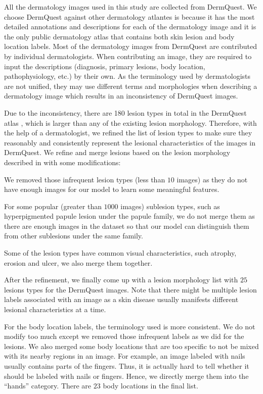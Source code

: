 \documentclass[letterpaper]{article}
\begin{document}
All the dermatology images used in this study are collected from DermQuest. We choose
DermQuest against other dermatology atlantes is because it has the most detailed
annotations and descriptions for each of the dermatology image and it is the only
public dermatology atlas that contains both skin lesion and body location labels.
Most of the dermatology images from DermQuest are contributed by individual dermatologists.
When contributing an image, they are required to input the descriptions
(diagnosis, primary lesions, body location, pathophysiology, etc.) by their own.
As the terminology used by dermatologists are not unified, they may use different
terms and morphologies when describing a dermatology image which results in an
inconsistency of DermQuest images.

Due to the inconsistency, there are  180 lesion types in total in the DermQuest atlas
, which is larger than any of the existing lesion morphology. Therefore, with the
help of a dermatologist, we refined the list of lesion types to make sure they
reasonably and consistently represent the lesional characteristics of the images
in DermQuest. We refine and merge lesions based on the lesion morphology described in \cite{cox2004diagnosis}
with some modifications:
\begin{inparaenum}[1)]
  \item We removed those infrequent lesion types (less than $10$ images) as they do not
  have enough images for our model to learn some meaningful features.
  \item For some popular (greater than $1000$ images) sublesion types, such as hyperpigmented
  papule lesion under the papule family, we do not merge them as there are enough images in the 
  dataset so that our model can distinguish them from other sublesions under the
  same family.
  \item Some of the lesion types have common visual characteristics, such atrophy, erosion and
  ulcer, we also merge them together.
\end{inparaenum}
After the refinement, we finally come up with a lesion morphology list with $25$
lesions types for the DermQuest images. Note that there might be multiple 
lesion labels associated with an image as a skin disease usually manifests
different lesional characteristics at a time.

For the body location labels, the terminology used is more consistent. We do not
modify too much except we removed those infrequent labels as we did for the lesions. We also
merged some body locations that are too specific to not be mixed with its nearby
regions in an image. For example, an image labeled with nails usually contains
parts of the fingers. Thus, it is actually hard to tell whether it should be labeled
with nails or fingers. Hence, we directly merge them into the ``hands'' category.
There are $23$ body locations in the final list.
\end{document}
